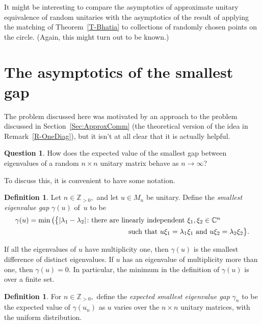 \documentclass[10pt]{amsart}
\theoremstyle{definition}
\newtheorem{dfn}[thm]{Definition}
\newtheorem{qst}[thm]{Question}
\newcommand{\gm}{\gamma}
\newcommand{\ld}{\lambda}
\newcommand{\C}{{\mathbb{C}}}
\newcommand{\N}{{\mathbb{Z}}_{> 0}}
\begin{document}
It might be interesting to compare the asymptotics of approximate
unitary equivalence of random unitaries with the asymptotics
of the result of applying the matching of Theorem~\ref{T-Bhatia}
to collections of randomly chosen points on the circle.
(Again,
this might turn out to be known.)

\section{The asymptotics of the smallest gap}\label{Sec:SmallestGap}

The problem discussed here was motivated by an approach to
the problem discussed in Section~\ref{Sec:ApproxComm}
(the theoretical version of the idea in Remark~\ref{R-OneDiag}),
but it isn't at all clear that it is actually helpful.

\begin{qst}\label{Q-LargestGap}
How does the expected value of the smallest gap between eigenvalues
of a random $n \times n$ unitary matrix
behave as $n \to \infty$?
\end{qst}

To discuss this, it is convenient to have some notation.

\begin{dfn}\label{D-EVGap}
Let $n \in \N,$ and let $u \in M_n$ be unitary.
Define the {\emph{smallest eigenvalue gap}} $\gm (u)$ of~$u$
to be
\begin{align*}
& \gm (u) = \min \big( \big\{ | \ld_1 - \ld_2 | \colon
         {\mbox{there are linearly independent $\xi_1, \xi_2 \in \C^n$}}
             \\
& \hspace*{37ex}      {\mbox{such that $u \xi_1 = \ld_1 \xi_1$
               and $u \xi_2 = \ld_2 \xi_2$}} \big\}.
\end{align*}
\end{dfn}

If all the eigenvalues of $u$ have multiplicity one,
then $\gm (u)$ is the smallest difference of distinct eigenvalues.
If $u$ has an eigenvalue of multiplicity more than one,
then $\gm (u) = 0.$
In particular,
the minimum in the definition of $\gm (u)$
is over a finite set.

\begin{dfn}\label{D-ExptGap}
For $n \in \N,$
define the {\emph{expected smallest eigenvalue gap}}
$\gm_n$ to be the expected value of $\gm (u_n)$ as
$u$ varies over the $n \times n$ unitary matrices,
with the uniform distribution.
\end{dfn}
\end{document}
